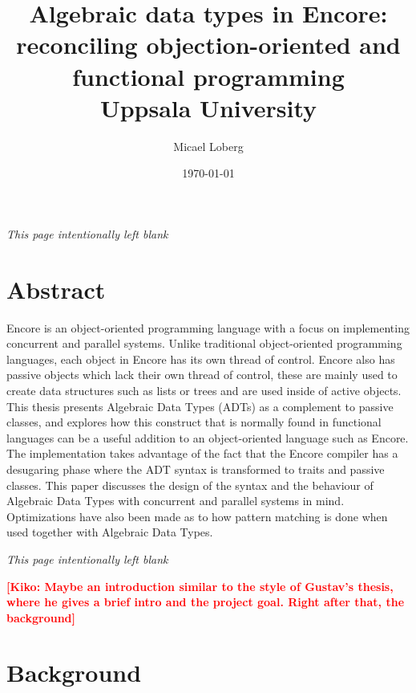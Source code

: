 \documentclass[10pt]{report}
\title{
    {Algebraic data types in Encore:}\\
    {reconciling objection-oriented and functional programming}\\
    {Uppsala University}
}
\author{Micael Loberg}
\date{\today}
\newcommand{\KIKO}[1]{\textcolor{red}{\textbf{[Kiko: #1]}}}
\begin{document}

\maketitle

\newpage\newpage
{\centering \textit{This page intentionally left blank}\par}
\vspace{\fill}


\chapter*{Abstract}
\par{Encore is an object-oriented programming language with a focus on implementing concurrent and parallel systems. Unlike traditional object-oriented programming languages, each object in Encore has its own thread of control. Encore also has passive objects which lack their own thread of control, these are mainly used to create data structures such as lists or trees and are used inside of active objects. This thesis presents Algebraic Data Types (ADTs) as a complement to passive classes, and explores how this construct that is normally found in functional languages can be a useful addition to an object-oriented language such as Encore. The implementation takes advantage of the fact that the Encore compiler has a desugaring phase where the ADT syntax is transformed to traits and passive classes. This paper discusses the design of the syntax and the behaviour of Algebraic Data Types with concurrent and parallel systems in mind. Optimizations have also been made as to how pattern matching is done when used together with Algebraic Data Types.}

\newpage\newpage
{\centering \textit{This page intentionally left blank}\par}
\vspace{\fill}


\tableofcontents

\KIKO{Maybe an introduction similar to the style of Gustav's thesis, where
he gives a brief intro and the project goal. Right after that, the background}

%
\chapter{Background}
%
\setcounter{page}{1}
\end{document}
